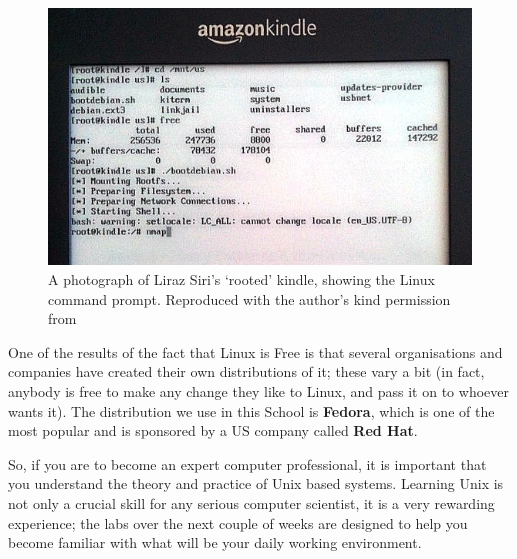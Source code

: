 \begin{figure}[h!tb]
  \begin{center}
    \includegraphics[width=13cm]{images/kindleroot}
  \end{center}
\caption{A photograph of Liraz Siri's `rooted' kindle, showing the Linux command prompt. Reproduced with the author's kind permission from }
\label{fig:kindlelinux}
\end{figure}

One of the results of the fact that Linux is Free is that several
organisations and companies have created their own distributions of
it; these vary a bit (in fact, anybody is free to make any change they
like to Linux, and pass it on to whoever wants it). The distribution
we use in this School is \textbf{Fedora}, which is
one of the most popular and is sponsored by a
US company called \textbf{Red Hat}.

So, if you are to become an expert computer professional, it is
important that you understand the theory and practice of Unix based
systems. Learning Unix is not only a crucial skill for any serious
computer scientist, it is a very rewarding experience; the labs over
the next couple of weeks are designed to help you become familiar with what will be your daily working environment.

